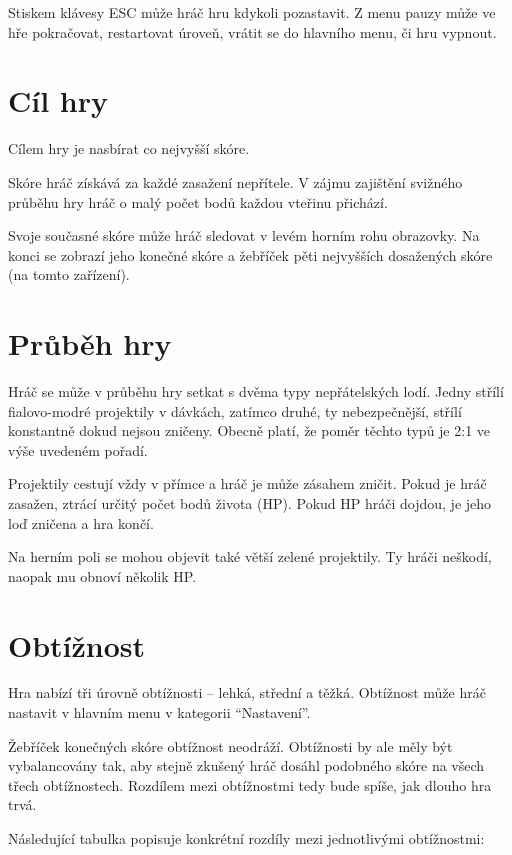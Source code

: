 \documentclass[12pt,a4paper,hidelinks]{article}
\begin{document}
Stiskem klávesy ESC může hráč hru kdykoli pozastavit. Z menu pauzy může ve hře pokračovat, restartovat úroveň, vrátit se do hlavního menu, či hru vypnout.

\section{Cíl hry}
Cílem hry je nasbírat co nejvyšší skóre.

Skóre hráč získává za každé zasažení nepřítele. V zájmu zajištění svižného průběhu hry hráč o malý počet bodů každou vteřinu přichází.

Svoje současné skóre může hráč sledovat v levém horním rohu obrazovky. Na konci se zobrazí jeho konečné skóre a žebříček pěti nejvyšších dosažených skóre (na tomto zařízení).
\section{Průběh hry}
Hráč se může v průběhu hry setkat s dvěma typy nepřátelských lodí. Jedny střílí fialovo-modré projektily v dávkách, zatímco druhé, ty nebezpečnější, střílí konstantně dokud nejsou zničeny. Obecně platí, že poměr těchto typů je 2:1 ve výše uvedeném pořadí.

Projektily cestují vždy v přímce a hráč je může zásahem zničit. Pokud je hráč zasažen, ztrácí určitý počet bodů života (HP). Pokud HP hráči dojdou, je jeho loď zničena a hra končí.

Na herním poli se mohou objevit také větší zelené projektily. Ty hráči neškodí, naopak mu obnoví několik HP.

\section{Obtížnost}
Hra nabízí tři úrovně obtížnosti -- lehká, střední a těžká. Obtížnost může hráč nastavit v hlavním menu v kategorii \enquote{Nastavení}.

Žebříček konečných skóre obtížnost neodráží. Obtížnosti by ale měly být vybalancovány tak, aby stejně zkušený hráč dosáhl podobného skóre na všech třech obtížnostech. Rozdílem mezi obtížnostmi tedy bude spíše, jak dlouho hra trvá.

Následující tabulka popisuje konkrétní rozdíly mezi jednotlivými obtížnostmi:
\end{document}
